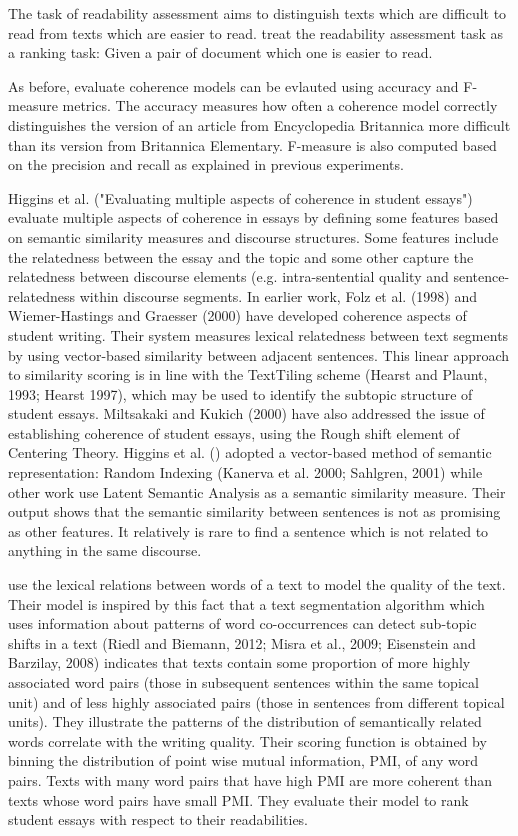 The task of readability assessment aims to distinguish texts which are difficult to read from texts which are easier to read. 
 treat the readability assessment task as a ranking task: Given a pair of document which one is easier to read. 

As before,  evaluate coherence models can be evlauted using accuracy and F-measure metrics. 
The accuracy measures how often a coherence model correctly distinguishes the version of an article from Encyclopedia Britannica more difficult than its version from Britannica Elementary. 
F-measure is also computed based on the precision and recall as explained in previous experiments. 


Higgins et al. ("Evaluating multiple aspects of coherence in student essays") evaluate multiple aspects of coherence in essays by defining some features based on semantic similarity measures and discourse structures. 
Some features include the relatedness between the essay and the topic and some other capture the relatedness between discourse elements (e.g. intra-sentential quality and sentence-relatedness within discourse segments. 
In earlier work, Folz et al. (1998) and Wiemer-Hastings and Graesser (2000) have developed coherence aspects of student writing.
Their system measures lexical relatedness between text segments by using vector-based similarity between adjacent sentences.
This linear approach to similarity scoring is in line with the TextTiling scheme (Hearst and Plaunt, 1993; Hearst 1997), which may be used to identify the subtopic structure of student essays. 
Miltsakaki and Kukich (2000) have also addressed the issue of establishing coherence of student essays, using the Rough shift element of Centering Theory. 
Higgins et al. () adopted a vector-based method of semantic representation: Random Indexing (Kanerva et al. 2000; Sahlgren, 2001) while other work use Latent Semantic Analysis as a semantic similarity measure. 
Their output shows that the semantic similarity between sentences is not as promising as other features. 
It relatively is rare to find a sentence which is not related to anything in the same discourse. 




 use the lexical relations between words of a text to model the quality of the text. 
Their model is inspired by this fact that a text segmentation algorithm which uses information about patterns of word co-occurrences can detect sub-topic shifts in a text (Riedl and Biemann, 2012; Misra et al., 2009; Eisenstein and Barzilay, 2008) indicates that texts contain some proportion of more highly associated word pairs (those in subsequent sentences within the same topical unit) and of less highly associated pairs (those in sentences from different topical units). 
They illustrate the patterns of the distribution of semantically related words correlate with the writing quality. 
Their scoring function is obtained by binning the distribution of point wise mutual information, PMI, of any word pairs. 
Texts with many word pairs that have high PMI are more coherent than texts whose word pairs have small PMI. 
They evaluate their model to rank student essays with respect to their readabilities. 


